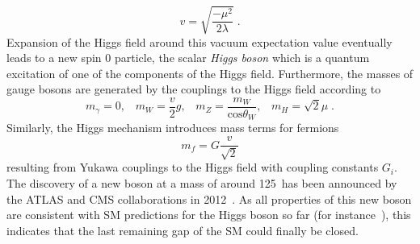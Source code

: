 \begin{description}
\begin{equation*}
v = \sqrt{\frac{-\mu^2}{2\lambda}} \; .
\end{equation*}
Expansion of the Higgs field around this vacuum expectation value eventually leads to a new spin 0 particle, the scalar \textit{Higgs boson} which is a quantum excitation of one of the components of the Higgs field. Furthermore, the masses of gauge bosons are generated by the couplings to the Higgs field according to
\begin{equation*}
m_{\gamma} = 0, \;\;\; m_W = \frac{v}{2}g, \;\;\; m_Z = \frac{m_W}{\mathrm{cos}\theta_{W}}, \;\;\; m_H = \sqrt{2}\mu \;.
\end{equation*}
Similarly, the Higgs mechanism introduces mass terms for fermions 
\begin{equation*}
m_{f} = G \frac{v}{\sqrt{2}}
\end{equation*}
resulting from Yukawa couplings to the Higgs field with coupling constants $G_i$. \\
The discovery of a new boson at a mass of around 125~\gev has been announced by the ATLAS and CMS collaborations in 2012~\cite{Aad:2012tfa, Chatrchyan:2012ufa}. As all properties of this new boson are consistent with SM predictions for the Higgs boson so far (\cf for instance~\cite{Aad:2013wqa, Aad:2014eva, Aad:2014eha, CMS-PAS-HIG-14-009}), this indicates that the last remaining gap of the SM could finally be closed.   
\end{description}

